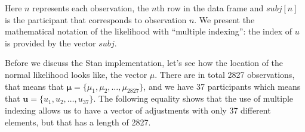 \documentclass[12pt,]{krantz}
\theoremstyle{definition}
\theoremstyle{definition}
\theoremstyle{definition}
\theoremstyle{remark}
\begin{document}
Here \(n\) represents each observation, the \(n\)th row in the data
frame and \(subj[n]\) is the participant that corresponds to observation
\(n\). We present the mathematical notation of the likelihood with
``multiple indexing'': the index of \(u\) is provided by the vector
\(subj\).

Before we discuss the Stan implementation, let's see how the location of
the normal likelihood looks like, the vector \(\mu\). There are in total
2827 observations, that means that
\(\boldsymbol{\mu}=\{\mu_1,\mu_2, \ldots, \mu_{2827}\}\), and we have 37
participants which means that
\(\boldsymbol{u}=\{u_1,u_2, \ldots, u_{37}\}\). The following equality
shows that the use of multiple indexing allows us to have a vector of
adjustments with only 37 different elements, but that has a length of
2827.
\end{document}
